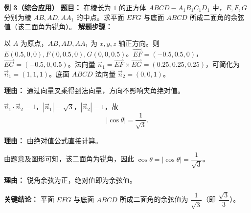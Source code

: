 \begin{examplebox}
	\medskip
	\textbf{\textcolor{CExample}{例 3（综合应用）}}
	\textbf{\textcolor{CExample}{题目：}}
	在棱长为 $1$ 的正方体 $ABCD-A_1B_1C_1D_1$ 中，$E,F,G$ 分别为棱 $AB,AD,AA_1$ 的中点。求平面 $EFG$ 与底面 $ABCD$ 所成二面角的余弦值（该二面角为锐角）。
	\textbf{\textcolor{CExample}{解题步骤：}}
	\begin{description}[style=nextline, leftmargin=2.8em, labelsep=0.5em, itemsep=0.45em]
		\item[\textbf{第一步（建系求法向）：}]
			以 $A$ 为原点，$AB, AD, AA_1$ 为 $x,y,z$ 轴正方向。则 $E(0.5,0,0), F(0,0.5,0), G(0,0,0.5)$。$\overrightarrow{EF}=(-0.5,0.5,0)$，$\overrightarrow{EG}=(-0.5,0,0.5)$。法向量 $\vec{n}_1 = \overrightarrow{EF}\times\overrightarrow{EG} = (0.25,0.25,0.25)$，可简化为 $\vec{n}_1=(1,1,1)$。底面 $ABCD$ 法向量 $\vec{n}_2=(0,0,1)$。
			\par\textbf{理由：} 通过向量叉乘得到法向量，方向不影响夹角绝对值。
		\item[\textbf{第二步（计算绝对值）：}]
			$\vec{n}_1\cdot\vec{n}_2 = 1$，$|\vec{n}_1|=\sqrt{3}$，$|\vec{n}_2|=1$，故
			\[
				|\cos\theta| = \frac{1}{\sqrt{3}}.
			\]
			\par\textbf{理由：} 由绝对值公式直接计算。
		\item[\textbf{第三步（判断符号得结果）：}]
			由题意及图形可知，该二面角为锐角，因此 $\cos\theta = |\cos\theta| = \dfrac{1}{\sqrt{3}}$。
			\par\textbf{理由：} 锐角余弦为正，绝对值即为余弦值。
	\end{description}
	\textbf{\textcolor{CExample}{关键结论：}}
	平面 $EFG$ 与底面 $ABCD$ 所成二面角的余弦值为 $\dfrac{1}{\sqrt{3}}$（即 $\dfrac{\sqrt{3}}{3}$）。
\end{examplebox}
